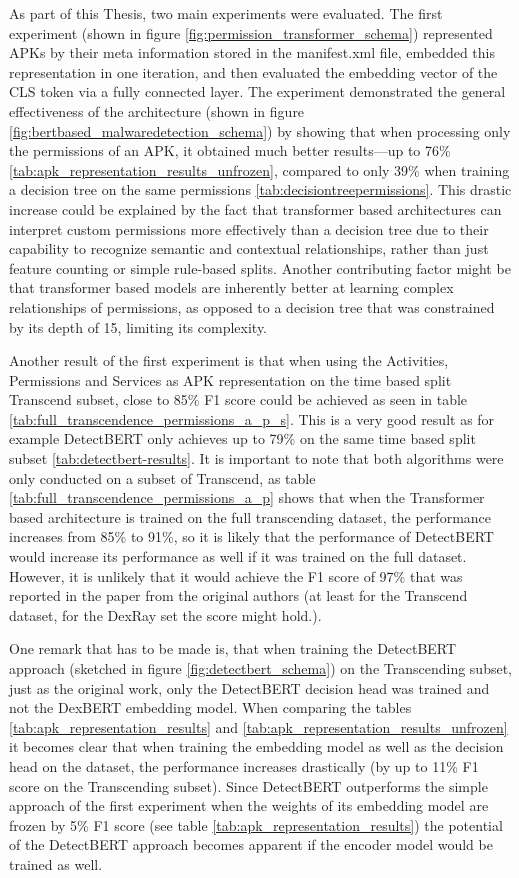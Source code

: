 As part of this Thesis, two main experiments were evaluated.
The first experiment (shown in figure \ref{fig:permission_transformer_schema}) represented
APKs by their meta information stored in the manifest.xml file, embedded this representation
in one iteration, and then evaluated the embedding vector of the CLS token via a fully connected layer.
The experiment demonstrated the general effectiveness of the architecture
(shown in figure \ref{fig:bertbased_malwaredetection_schema}) by showing that when processing only
the permissions of an APK, it obtained much better results—up to 76\%
\ref{tab:apk_representation_results_unfrozen}, compared to only 39\% when training a decision tree
on the same permissions \ref{tab:decisiontreepermissions}. 
This drastic increase could be explained by the fact that transformer 
based architectures can interpret custom permissions more effectively than a decision tree due 
to their capability to recognize semantic and contextual relationships, 
rather than just feature counting or simple rule-based splits. 
Another contributing factor might be that transformer based models are inherently better at 
learning complex relationships of permissions, 
as opposed to a decision tree that was constrained by its depth of 15, limiting its complexity.

Another result of the first experiment is that when using the Activities, Permissions and Services 
as APK representation on the time based split Transcend subset, close to 85\% 
F1 score could be achieved as seen in table \ref{tab:full_transcendence_permissions_a_p_s}.
This is a very good result as for example DetectBERT only achieves up to 79\% on the same time based 
split subset \ref{tab:detectbert-results}.
It is important to note that both algorithms were only conducted on a subset of Transcend,
as table \ref{tab:full_transcendence_permissions_a_p} shows that when the Transformer based
architecture is trained on the full transcending dataset, the performance increases from 85\% 
to 91\%, so it is likely that the performance of DetectBERT would increase its performance
as well if it was trained on the full dataset. However, it is unlikely that it would achieve the
F1 score of 97\% that was reported in the paper from the original authors \cite{detectbert}
(at least for the Transcend dataset, for the DexRay set the score might hold.).

One remark that has to be made is, that when training the DetectBERT approach 
(sketched in figure \ref{fig:detectbert_schema}) on the Transcending subset, just as the original work, 
only the DetectBERT decision head was trained and not the DexBERT embedding model.
When comparing the tables \ref{tab:apk_representation_results} and 
\ref{tab:apk_representation_results_unfrozen} it becomes clear that when training the embedding 
model as well as the decision head on the dataset, the performance increases drastically (by
up to 11\% F1 score on the Transcending subset).
Since DetectBERT outperforms the simple approach of the first experiment when the weights 
of its embedding model are frozen by 5\% F1 score (see table \ref{tab:apk_representation_results}) the 
potential of the DetectBERT approach becomes apparent if the encoder model would be trained as well.

